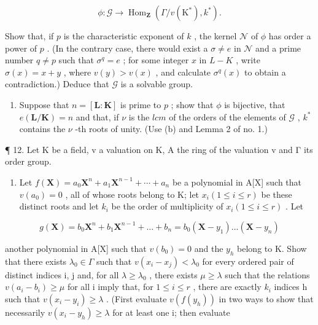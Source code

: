 \[
\phi \colon \mathcal {G} \to \operatorname{Hom} _ {\mathbf {Z}} (\Gamma / v (\mathrm{K} ^ {*}), k ^ {*}).
\]

Show that, if \(p\) is the characteristic exponent of \(k\) , the kernel \(\mathcal{N}\) of \(\phi\) has order a power of \(p\) . (In the contrary case, there would exist a \(\sigma \neq e\) in \(\mathcal{N}\) and a prime number \(q \neq p\) such that \(\sigma^q = e\) ; for some integer \(x\) in \(L - K\) , write \(\sigma(x) = x + y\) , where \(v(y) > v(x)\) , and calculate \(\sigma^q(x)\) to obtain a contradiction.) Deduce that \(\mathcal{G}\) is a solvable group.

\begin{enumerate}
\def\labelenumi{(\alph{enumi})}
\setcounter{enumi}{2}
\tightlist
\item
  Suppose that \(n = [\mathbf{L} : \mathbf{K}]\) is prime to \(p\) ; show that \(\phi\) is bijective, that \(e(\mathbf{L} / \mathbf{K}) = n\) and that, if \(\nu\) is the \(lcm\) of the orders of the elements of \(\mathcal{G}\) , \(k^*\) contains the \(\nu\) -th roots of unity. (Use (b) and Lemma 2 of no. 1.)
\end{enumerate}

¶ 12. Let K be a field, v a valuation on K, A the ring of the valuation v and Γ its order group.

\begin{enumerate}
\def\labelenumi{(\alph{enumi})}
\tightlist
\item
  Let \(f(\mathbf{X}) = a_{0}\mathbf{X}^{n} + a_{1}\mathbf{X}^{n-1} + \cdots + a_{n}\) be a polynomial in A{[}X{]} such that \(v(a_{0}) = 0\) , all of whose roots belong to K; let \(x_{i} (1 \leqslant i \leqslant r)\) be these distinct roots and let \(k_{i}\) be the order of multiplicity of \(x_{i} (1 \leqslant i \leqslant r)\) . Let
\end{enumerate}

\[
g (\mathbf {X}) = b _ {0} \mathbf {X} ^ {n} + b _ {1} \mathbf {X} ^ {n - 1} + \dots + b _ {n} = b _ {0} (\mathbf {X} - y _ {1}) \dots (\mathbf {X} - y _ {n})
\]

another polynomial in A{[}X{]} such that \(v(b_{0}) = 0\) and the \(y_{h}\) belong to K. Show that there exists \(\lambda_{0} \in \Gamma\) such that \(v(x_{i} - x_{j}) < \lambda_{0}\) for every ordered pair of distinct indices i, j and, for all \(\lambda \geqslant \lambda_{0}\) , there exists \(\mu \geqslant \lambda\) such that the relations \(v(a_{i} - b_{i}) \geqslant \mu\) for all i imply that, for \(1 \leqslant i \leqslant r\) , there are exactly \(k_{i}\) indices h such that \(v(x_{i} - y_{i}) \geqslant \lambda\) . (First evaluate \(v(f(y_{h}))\) in two ways to show that necessarily \(v(x_{i} - y_{h}) \geqslant \lambda\) for at least one i; then evaluate

